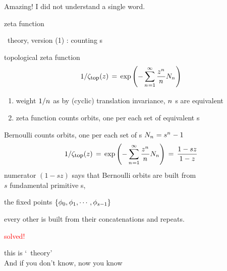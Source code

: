\begin{frame}{}
\begin{bartlett}
     Amazing! I did not understand a single word.
\end{bartlett}

\vfill
\begin{center}
{\huge zeta function}
\end{center}
\vfill
\end{frame} %

\begin{frame}{\po\ theory, version (1) : counting {\lattstate}s}

\begin{block}{topological zeta function}
\[
1/\zeta_{\mbox{\footnotesize top}} (z)
 \,=\,  \exp \left(-\sum_{{n_{}}=1}^\infty
\frac{z^{n_{}}}{{n_{}}} N_{n_{}}
         \right)
\] %
\end{block}
        \begin{enumerate}
              \item
weight ${1}/{{n_{}}}$
as by (cyclic) translation invariance, ${n_{}}$ {\lattstate}s are
equivalent
              \item
zeta function counts {\color{blue} orbits}, one per each set of equivalent
{\lattstate}s
            \end{enumerate}
\end{frame} %

\begin{frame}{Bernoulli \tzeta}
counts {\color{blue} orbits},
one per each set of {\lattstate}s $N_{n_{}}=s^{{n_{}}} - 1$
\[
1/\zeta_{\mbox{\footnotesize top}} (z)
 \,=\,  \exp \left(-\sum_{{n_{}}=1}^\infty
\frac{z^{n_{}}}{{n_{}}} N_n
         \right)
\,=\,
\frac{1 -  {s}z}{1 - z}
\] %
numerator $(1 - {s}z)$ says that Bernoulli orbits are built from \\
$s$
fundamental {\color{blue}primitive} {\lattstate}s,

\hfill
the fixed points
$\{\phi_0,\phi_1,\cdots,\phi_{s-1}\}$
\medskip

every other {\lattstate} is
built from their concatenations and repeats.

\vfill
\hfill {\Huge \textcolor{red}{solved!}}
\vfill

{\color{blue}this is `\po\ theory'}
\\
 And if you don't know,
 {now you know}

\end{frame} %

